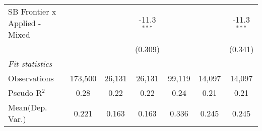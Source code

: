 \begin{tabular}{lcccccc}
   SB Frontier x Applied - Mixed &               &               & -11.3$^{***}$ &               &               & -11.3$^{***}$\\   
                                 &               &               & (0.309)       &               &               & (0.341)\\   
   \midrule
   \emph{Fit statistics}\\
   Observations                  & 173,500       & 26,131        & 26,131        & 99,119        & 14,097        & 14,097\\  
   Pseudo R$^2$                  & 0.28          & 0.22          & 0.22          & 0.24          & 0.21          & 0.21\\  
Mean(Dep. Var.) & 0.221 & 0.163 & 0.163 & 0.336 & 0.245 & 0.245 \\
   

\end{tabular}
